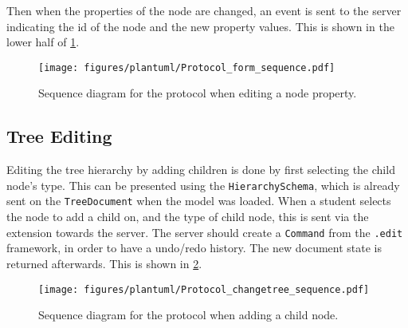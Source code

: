 Then when the properties of the node are changed, an event is sent to the server indicating the id of the node and the new property values.
This is shown in the lower half of \cref{fig:protocol-form}.

\begin{figure}[htbp]  %
  \centering
  \texttt{[image: figures/plantuml/Protocol\_form\_sequence.pdf]}
  \caption[Protocol Sequence Diagram of Property Form]{Sequence diagram for the protocol when editing a node property. \bluearrowDesc}\label{fig:protocol-form}
\end{figure}

\FloatBarrier

\subsection{Tree Editing}

Editing the tree hierarchy by adding children is done by first selecting the child node's type.
This can be presented using the \texttt{HierarchySchema}, which is already sent on the \texttt{TreeDocument} when the model was loaded.
When a student selects the node to add a child on, and the type of child node, this is sent via the extension towards the server.
The server should create a \texttt{Command} from the \texttt{.edit} framework, in order to have a undo/redo history.
The new document state is returned afterwards.
This is shown in \cref{fig:protocol-changetree}.

\begin{figure}[htbp]  %
  \centering
  \texttt{[image: figures/plantuml/Protocol\_changetree\_sequence.pdf]}
  \caption[Protocol Sequence Diagram of Tree Changes]{Sequence diagram for the protocol when adding a child node. \bluearrowDesc}\label{fig:protocol-changetree}
\end{figure}


\FloatBarrier
